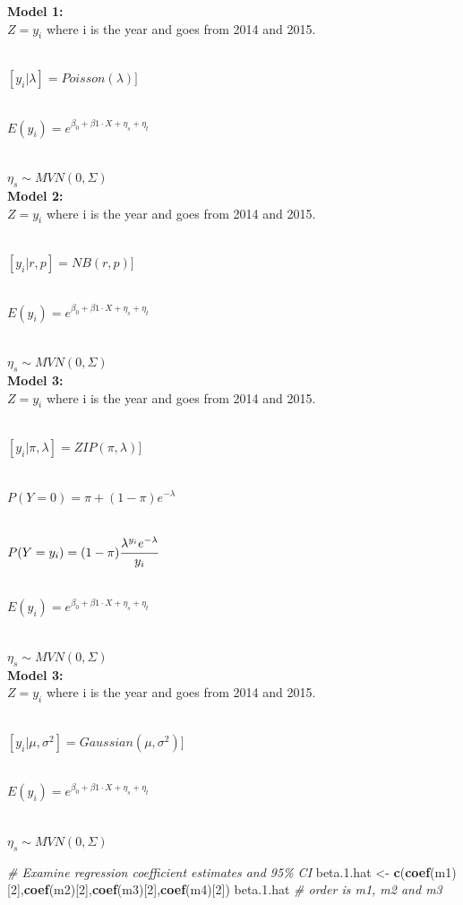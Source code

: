 \documentclass[
]{book}
\newenvironment{Shaded}{\begin{snugshade}}{\end{snugshade}}
\newcommand{\CommentTok}[1]{\textcolor[rgb]{0.56,0.35,0.01}{\textit{#1}}}
\newcommand{\DecValTok}[1]{\textcolor[rgb]{0.00,0.00,0.81}{#1}}
\newcommand{\FloatTok}[1]{\textcolor[rgb]{0.00,0.00,0.81}{#1}}
\newcommand{\FunctionTok}[1]{\textcolor[rgb]{0.13,0.29,0.53}{\textbf{#1}}}
\newcommand{\NormalTok}[1]{#1}
\newcommand{\OtherTok}[1]{\textcolor[rgb]{0.56,0.35,0.01}{#1}}
\begin{document}
\textbf{Model 1:}\\
\(Z=y_i\) where i is the year and goes from 2014 and 2015.\\
\strut \\
\([y_i|\lambda]=Poisson(\lambda)]\)\\
\strut \\
\(E(y_i)=e^{\beta_0+\beta1 \cdot X+\eta_s+\eta_t}\)\\
\strut \\
\(\eta_s \sim MVN(0,\Sigma)\)~\\
\textbf{Model 2:}\\
\(Z=y_i\) where i is the year and goes from 2014 and 2015.\\
\strut \\
\([y_i|r,p]=NB(r,p)]\)\\
\strut \\
\(E(y_i)=e^{\beta_0+\beta1 \cdot X+\eta_s+\eta_t}\)\\
\strut \\
\(\eta_s \sim MVN(0,\Sigma)\)~\\
\textbf{Model 3:}\\
\(Z=y_i\) where i is the year and goes from 2014 and 2015.\\
\strut \\
\([y_i|\pi,\lambda]=ZIP(\pi,\lambda)]\)\\
\strut \\
\(P(Y=0)=\pi+(1-\pi)e^{-\lambda}\)\\
\strut \\
\(P(Y=y_i)=(1-\pi)\cfrac{\lambda^{y_i}e^{-\lambda}}{y_i}\)\\
\strut \\
\(E(y_i)=e^{\beta_0+\beta1 \cdot X+\eta_s+\eta_t}\)\\
\strut \\
\(\eta_s \sim MVN(0,\Sigma)\)~\\
\textbf{Model 3:}\\
\(Z=y_i\) where i is the year and goes from 2014 and 2015.\\
\strut \\
\([y_i|\mu, \sigma^2]=Gaussian(\mu,\sigma^2)]\)\\
\strut \\
\(E(y_i)=e^{\beta_0+\beta1 \cdot X+\eta_s+\eta_t}\)\\
\strut \\
\(\eta_s \sim MVN(0,\Sigma)\)~

\begin{Shaded}
\begin{Highlighting}[]
\CommentTok{\# Examine regression coefficient estimates and 95\% CI}
\NormalTok{beta.}\FloatTok{1.}\NormalTok{hat }\OtherTok{\textless{}{-}} \FunctionTok{c}\NormalTok{(}\FunctionTok{coef}\NormalTok{(m1)[}\DecValTok{2}\NormalTok{],}\FunctionTok{coef}\NormalTok{(m2)[}\DecValTok{2}\NormalTok{],}\FunctionTok{coef}\NormalTok{(m3)[}\DecValTok{2}\NormalTok{],}\FunctionTok{coef}\NormalTok{(m4)[}\DecValTok{2}\NormalTok{])}
\NormalTok{beta.}\FloatTok{1.}\NormalTok{hat }\CommentTok{\# order is m1, m2 and m3}
\end{Highlighting}
\end{Shaded}
\end{document}
